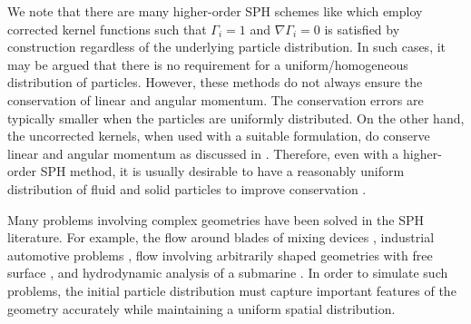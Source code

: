 \documentclass[preprint,12pt]{elsarticle}
\begin{document}
We note that there are many higher-order SPH schemes like
\cite{dilts1999moving,dilts2000moving,bonet_lok:cmame:1999,crksph:jcp:2017}
which employ corrected kernel functions such that $\Gamma_i=1$ and $\nabla
\Gamma_i=0$ is satisfied by construction regardless of the underlying
particle distribution. In such cases, it may be argued that there is no
requirement for a uniform/homogeneous distribution of particles. However,
these methods do not always ensure the conservation of linear and angular
momentum. The conservation errors are typically smaller when the particles
are uniformly distributed. On the other hand, the uncorrected kernels, when
used with a suitable formulation, do conserve linear and angular momentum as
discussed in \cite{crksph:jcp:2017}. Therefore, even with a higher-order SPH
method, it is usually desirable to have a reasonably uniform distribution of
fluid and solid particles to improve conservation \cite{kiara_sph_2013}.

Many problems involving complex geometries have been solved in the SPH
literature. For example, the flow around blades of mixing devices
\cite{eitzlmayr2014novel}, industrial automotive problems
\cite{chiron2019fast}, flow involving arbitrarily shaped geometries with free
surface \cite{canelas_sphdcdem_2016,marrone_fast_2010}, and hydrodynamic
analysis of a submarine \cite{mogan_hydrodynamic_2018}. In order to simulate
such problems, the initial particle distribution must capture important
features of the geometry accurately while maintaining a uniform spatial
distribution.
\end{document}
